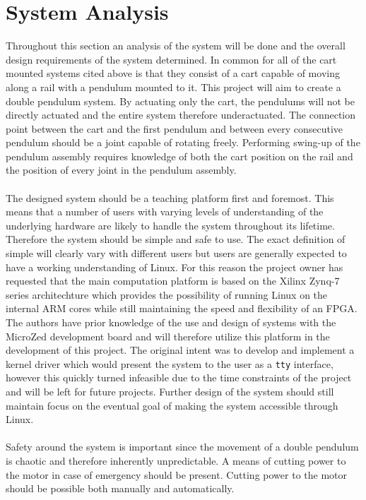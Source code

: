 \section{System Analysis}
Throughout this section an analysis of the system will be done and the overall design requirements of the system determined.
In common for all of the cart mounted systems cited above is that they consist of a cart capable of moving along a rail with a pendulum mounted to it.
This project will aim to create a double pendulum system.
By actuating only the cart, the pendulums will not be directly actuated and the entire system therefore underactuated.
The connection point between the cart and the first pendulum and between every consecutive pendulum should be a joint capable of rotating freely.
Performing swing-up of the pendulum assembly requires knowledge of both the cart position on the rail and the position of every joint in the pendulum assembly.  
\\~\\
The designed system should be a teaching platform first and foremost.
This means that a number of users with varying levels of understanding of the underlying hardware are likely to handle the system throughout its lifetime.
Therefore the system should be simple and safe to use.
The exact definition of simple will clearly vary with different users but users are generally expected to have a working understanding of Linux.
For this reason the project owner has requested that the main computation platform is based on the Xilinx Zynq-7 series architechture which provides the possibility of running Linux on the internal ARM cores while still maintaining the speed and flexibility of an FPGA.
The authors have prior knowledge of the use and design of systems with the MicroZed development board and will therefore utilize this platform in the development of this project. 
The original intent was to develop and implement a kernel driver which would present the system to the user as a \texttt{tty} interface, however this quickly turned infeasible due to the time constraints of the project and will be left for future projects.
Further design of the system should still maintain focus on the eventual goal of making the system accessible through Linux.
\\~\\
Safety around the system is important since the movement of a double pendulum is chaotic and therefore inherently unpredictable.
A means of cutting power to the motor in case of emergency should be present.  
Cutting power to the motor should be possible both manually and automatically.
